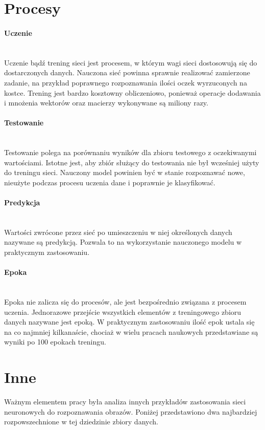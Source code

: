 \section{Procesy}

\paragraph{Uczenie} \mbox{}\\
Uczenie bądź trening sieci jest procesem, w którym wagi sieci dostosowują się do dostarczonych danych.
Nauczona sieć powinna sprawnie realizować zamierzone zadanie, na przykład poprawnego
rozpoznawania ilości oczek wyrzuconych na kostce. Trening jest bardzo kosztowny obliczeniowo,
ponieważ operacje dodawania i mnożenia wektorów oraz macierzy wykonywane są miliony razy.

\paragraph{Testowanie} \mbox{}\\
Testowanie polega na porównaniu wyników dla zbioru testowego z oczekiwanymi wartościami.
Istotne jest, aby zbiór służący do testowania nie był wcześniej użyty do treningu sieci.
Nauczony model powinien być w stanie rozpoznawać nowe, nieużyte podczas procesu uczenia
dane i poprawnie je klasyfikować.

\paragraph{Predykcja} \mbox{}\\
Wartości zwrócone przez sieć po umieszczeniu w niej określonych danych nazywane są
predykcją. Pozwala to na wykorzystanie nauczonego modelu w praktycznym zastosowaniu.

\paragraph{Epoka} \mbox{}\\
Epoka nie zalicza się do procesów, ale jest bezpośrednio związana z procesem uczenia.
Jednorazowe przejście wszystkich elementów z treningowego zbioru danych nazywane jest epoką.
W praktycznym zastosowaniu ilość epok ustala się na co najmniej kilkanaście, chociaż w
wielu pracach naukowych przedstawiane są wyniki po 100 epokach treningu.

\section{Inne}
Ważnym elementem pracy była analiza innych przykładów zastosowania sieci neuronowych do
rozpoznawania obrazów. Poniżej przedstawiono dwa najbardziej rozpowszechnione w tej dziedzinie
zbiory danych.

